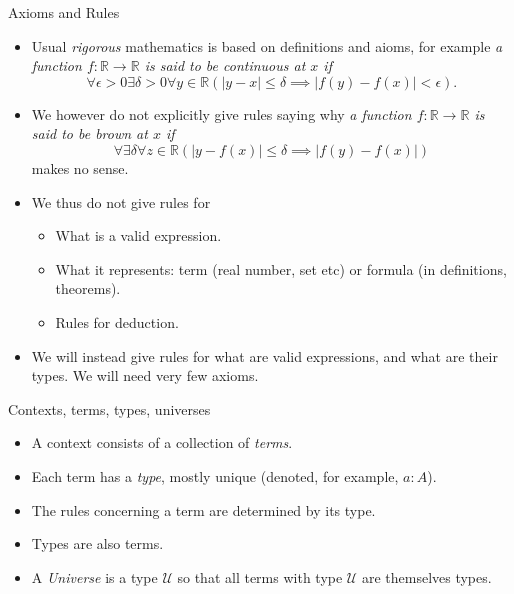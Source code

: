 \documentclass[10 pt., handout]{beamer}
\theoremstyle{plain}
\theoremstyle{remark}
\newcommand{\R}{\mathbb{R}}
\newcommand{\U}{\mathcal{U}}
\begin{document}
\begin{frame}{Axioms and Rules}

\begin{itemize}

\item Usual \emph{rigorous} mathematics is based on definitions and aioms, for example \emph{a function $f : \R \to \R$ is said to be continuous at $x$ if 
$$\forall \epsilon > 0 \exists \delta >0 \forall y \in \R (|y - x| \le \delta \implies |f(y) - f(x)| < \epsilon).$$}  

\item We however do not explicitly give rules saying why \emph{ a function $f : \R \to \R$ is said to be brown at $x$ if 
$$\forall \exists \delta \forall z \in \R (|y - f(x)| \le \delta \implies |f(y) - f(x)|)$$} makes no sense. 

\item We thus do not give rules for 
\begin{itemize}
\item What is a valid expression.
\item What it represents: term (real number, set etc) or formula (in definitions, theorems).
\item Rules for deduction.
\end{itemize}

\item We will instead give rules for what are valid expressions, and what are their types. We will need very few axioms.

\end{itemize}

\end{frame}

\begin{frame}{Contexts, terms, types, universes}

\begin{itemize}

\item A context consists of a collection of \emph{terms}.

\item Each term has a \emph{type}, mostly unique (denoted, for example, $a : A$).

\item The rules concerning a term are determined by its type.

\item Types are also terms.

\item A \emph{Universe} is a type $\U$ so that all terms with type $\U$ are themselves types.

\end{itemize}

\end{frame}
\end{document}
